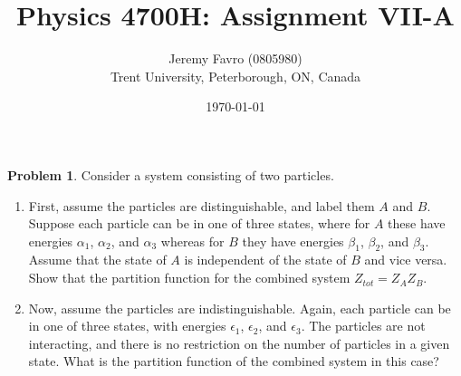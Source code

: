 \documentclass[10pt]{article}
\title{Physics 4700H: Assignment VII-A}
\author{Jeremy Favro (0805980) \\ Trent University, Peterborough, ON, Canada}
\date{\today}
\theoremstyle{definition}
\newtheorem{problem}{Problem}
\begin{document}
\maketitle

\begin{problem} Consider a system consisting of two particles.
\begin{enumerate}[label=(\alph*)]
  \item First, assume the particles are distinguishable, and label them $A$ and $B$. Suppose each
        particle can be in one of three states, where for $A$ these have energies $\alpha_1$, $\alpha_2$, and $\alpha_3$ whereas
        for $B$ they have energies $\beta_1$, $\beta_2$, and $\beta_3$. Assume that the state of $A$ is independent of
        the state of $B$ and vice versa. Show that the partition function for the combined system
        $Z_{tot} = Z_AZ_B$.
  \item Now, assume the particles are indistinguishable. Again, each particle can be in one of
        three states, with energies $\epsilon_1$, $\epsilon_2$, and $\epsilon_3$. The particles are not interacting, and there is no
        restriction on the number of particles in a given state. What is the partition function of the
        combined system in this case?
\end{enumerate}
\end{problem}
\end{document}
